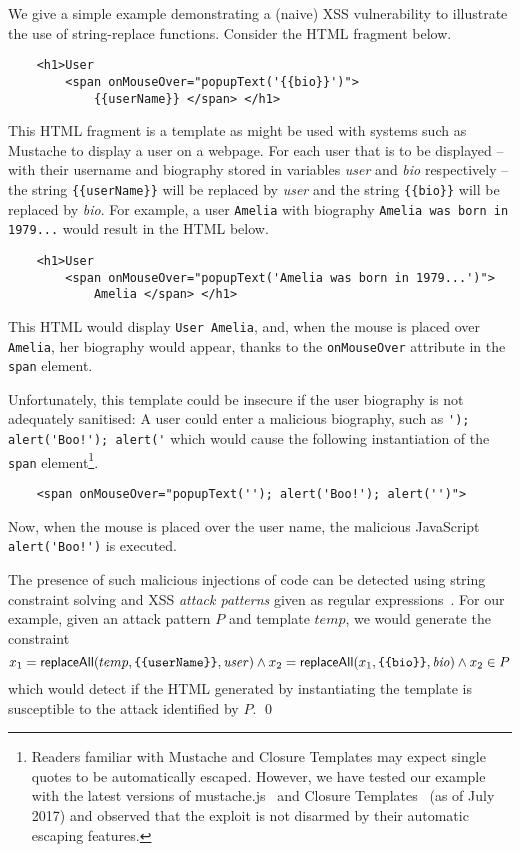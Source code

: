 

\begin{example}
We give a simple example demonstrating a (naive) XSS vulnerability to illustrate the use of string-replace functions.
Consider the HTML fragment below.
\begin{verbatim}
    <h1>User 
        <span onMouseOver="popupText('{{bio}}')">
            {{userName}} </span> </h1>
\end{verbatim}
This HTML fragment is a template as might be used with systems such as Mustache to display a user on a webpage.
For each user that is to be displayed -- with their username and biography stored in variables \emph{user} and \emph{bio} respectively -- the string \verb+{{userName}}+ will be replaced by \emph{user} and the string \verb+{{bio}}+ will be replaced by \emph{bio}.
For example, a user \verb+Amelia+ with biography \verb+Amelia was born in 1979...+ would result in the HTML below.
\begin{verbatim}
    <h1>User 
        <span onMouseOver="popupText('Amelia was born in 1979...')">
            Amelia </span> </h1>
\end{verbatim}
This HTML would display \verb+User Amelia+, and, when the mouse is placed over \verb+Amelia+, her biography would appear, thanks to the \verb+onMouseOver+ attribute in the \verb+span+ element.

Unfortunately, this template could be insecure if the user biography is not adequately sanitised: 
A user could enter a malicious biography, such as \verb+'); alert('Boo!'); alert('+ which would cause the following instantiation of the \verb+span+ element\footnote{
	Readers familiar with Mustache and Closure Templates may expect single quotes to be automatically escaped.
	However, we have tested our example with the latest versions of mustache.js~\cite{MustacheJS} and Closure Templates~\cite{Closure} (as of July 2017) and observed that the exploit is not disarmed by their automatic escaping features.
}.
\begin{verbatim}
    <span onMouseOver="popupText(''); alert('Boo!'); alert('')">
\end{verbatim}
Now, when the mouse is placed over the user name, the malicious JavaScript \verb+alert('Boo!')+ is executed.

The presence of such malicious injections of code can be detected using string constraint solving and XSS \emph{attack patterns} given as regular expressions~\cite{BCFJKKV08,Berkeley-JavaScript,YABI14}.
For our example, given an attack pattern $P$ and template $temp$, we would generate the constraint
\[
    x_1 = \replaceall(temp, \verb+{{userName}}+, \mathit{user})
    \land
    x_2 = \replaceall(x_1, \verb+{{bio}}+, \mathit{bio})
    \land
    x_2 \in P
\]
which would detect if the HTML generated by instantiating the template is
    susceptible to the attack identified by $P$. \qed
\end{example}

